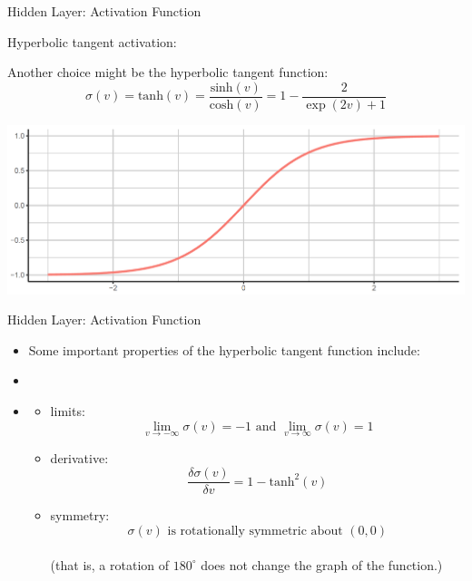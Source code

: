 \begin{frame} {Hidden Layer: Activation Function}
  \begin{blocki}{Hyperbolic tangent activation:}
    \item Another choice might be the hyperbolic tangent function:
    $$ \sigma (v) = \text{tanh}(v) = \frac{\text{sinh}(v)}{\text{cosh}(v)} = 1 - \frac{2}{\exp(2v) + 1}$$
  \end{blocki}
  
\begin{center}
\includegraphics[width=1\textwidth]{plots/tanh.png}
\end{center}

\end{frame}

\begin{frame} {Hidden Layer: Activation Function}
  \begin{itemize}
    \item Some important properties of the hyperbolic tangent function include:
    \item[]
    \item[]
    \begin{itemize}
      \item limits: $$\lim_{v \to -\infty} \sigma(v) = -1 \text{ and } \lim_{v \to \infty} \sigma(v) = 1$$
      \item derivative: $$\frac{\delta\sigma(v)}{\delta v} = 1 - \text{tanh}^2(v)$$
      \item symmetry: $$\sigma(v) \text{ is rotationally symmetric about } (0, 0)$$ \\
      (that is, a rotation of $180^{\circ}$ does not change the graph of the function.)
    \end{itemize}
  \end{itemize}
\end{frame}

